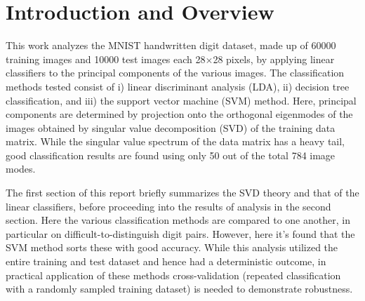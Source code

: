 \documentclass{article}
\begin{document}
\section{Introduction and Overview}
This work analyzes the MNIST handwritten digit dataset, made up of 60000 training images and 10000 test images each 28$\times$28 pixels, by applying linear classifiers to the principal components of the various images. The classification methods tested consist of i) linear discriminant analysis (LDA), ii) decision tree classification, and iii) the support vector machine (SVM) method. Here, principal components are determined by projection onto the orthogonal eigenmodes of the images obtained by singular value decomposition (SVD) of the training data matrix. While the singular value spectrum of the data matrix has a heavy tail, good classification results are found using only 50 out of the total 784 image modes.

The first section of this report briefly summarizes the SVD theory and that of the linear classifiers, before proceeding into the results of analysis in the second section. Here the various classification methods are compared to one another, in particular on difficult-to-distinguish digit pairs. However, here it's found that the SVM method sorts these with good accuracy. While this analysis utilized the entire training and test dataset and hence had a deterministic outcome, in practical application of these methods cross-validation (repeated classification with a randomly sampled training dataset) is needed to demonstrate robustness.

\end{document}
